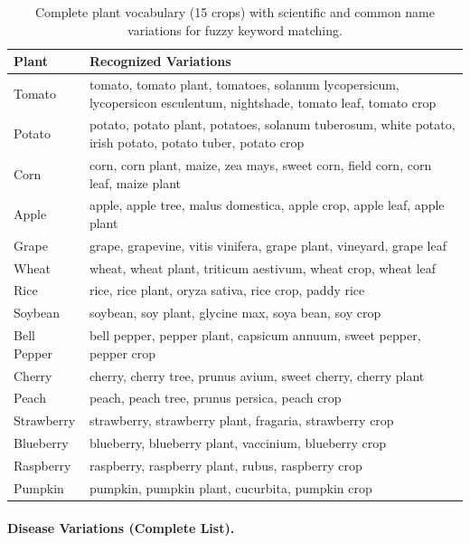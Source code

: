 \documentclass[11pt]{article}
\begin{document}
\begin{table}[t]
\centering
\small
\setlength{\tabcolsep}{4pt}
\begin{tabular}{lp{13.5cm}}
\hline
\textbf{Plant} & \textbf{Recognized Variations} \\
\hline
Tomato & tomato, tomato plant, tomatoes, solanum lycopersicum, lycopersicon esculentum, nightshade, tomato leaf, tomato crop \\
Potato & potato, potato plant, potatoes, solanum tuberosum, white potato, irish potato, potato tuber, potato crop \\
Corn & corn, corn plant, maize, zea mays, sweet corn, field corn, corn leaf, maize plant \\
Apple & apple, apple tree, malus domestica, apple crop, apple leaf, apple plant \\
Grape & grape, grapevine, vitis vinifera, grape plant, vineyard, grape leaf \\
Wheat & wheat, wheat plant, triticum aestivum, wheat crop, wheat leaf \\
Rice & rice, rice plant, oryza sativa, rice crop, paddy rice \\
Soybean & soybean, soy plant, glycine max, soya bean, soy crop \\
Bell Pepper & bell pepper, pepper plant, capsicum annuum, sweet pepper, pepper crop \\
Cherry & cherry, cherry tree, prunus avium, sweet cherry, cherry plant \\
Peach & peach, peach tree, prunus persica, peach crop \\
Strawberry & strawberry, strawberry plant, fragaria, strawberry crop \\
Blueberry & blueberry, blueberry plant, vaccinium, blueberry crop \\
Raspberry & raspberry, raspberry plant, rubus, raspberry crop \\
Pumpkin & pumpkin, pumpkin plant, cucurbita, pumpkin crop \\
\hline
\end{tabular}
\caption{Complete plant vocabulary (15 crops) with scientific and common name variations for fuzzy keyword matching.}
\label{tab:plant_vocab_full}
\end{table}

\paragraph{Disease Variations (Complete List).}
\end{document}
